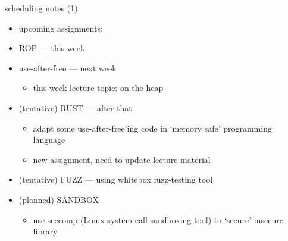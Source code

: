 \begin{frame}{scheduling notes (1)}
    \begin{itemize}
    \item upcoming assignments:
    \space{.5cm}
    \item ROP --- this week
    \item use-after-free --- next week
        \begin{itemize}
        \item this week lecture topic: on the heap
        \end{itemize}
    \item (tentative) RUST --- after that
        \begin{itemize}
        \item adapt some use-after-free'ing code in `memory safe' programming language
        \item new assignment, need to update lecture material
        \end{itemize}
    \item (tentative) FUZZ --- using whitebox fuzz-testing tool
    \item (planned) SANDBOX 
        \begin{itemize}
        \item use seccomp (Linux system call sandboxing tool) to `secure' insecure library
        \end{itemize}
    \end{itemize}
\end{frame}


